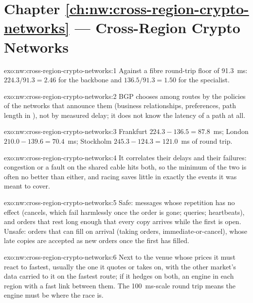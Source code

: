 \section*{Chapter \ref{ch:nw:cross-region-crypto-networks} --- Cross-Region Crypto Networks}

\begin{solution}{exo:nw:cross-region-crypto-networks:1}
Against a fibre round-trip floor of \qty{91.3}{\milli\second}: $224.3/91.3 = 2.46$ for the backbone and $136.5/91.3 = 1.50$ for the specialist.
\end{solution}

\begin{solution}{exo:nw:cross-region-crypto-networks:2}
BGP chooses among routes by the policies of the networks that announce them (business relationships, preferences, path length in ),
not by measured delay; it does not know the latency of a path at all.
\end{solution}

\begin{solution}{exo:nw:cross-region-crypto-networks:3}
Frankfurt $224.3 - 136.5 = 87.8$~ms; London $210.0 - 139.6 = 70.4$~ms; Stockholm $245.3 - 124.3 = 121.0$~ms of round trip.
\end{solution}

\begin{solution}{exo:nw:cross-region-crypto-networks:4}
It correlates their delays and their failures: congestion or a fault on the shared cable hits both, so the minimum of the two is often no better
than either, and racing saves little in exactly the events it was meant to cover.
\end{solution}

\begin{solution}{exo:nw:cross-region-crypto-networks:5}
Safe: messages whose repetition has no effect (cancels, which fail harmlessly once the order is gone; queries; heartbeats), and orders that rest
long enough that every copy arrives while the first is open. Unsafe: orders that can fill on arrival (taking orders, immediate-or-cancel), whose late
copies are accepted as new orders once the first has filled.
\end{solution}

\begin{solution}{exo:nw:cross-region-crypto-networks:6}
Next to the venue whose prices it must react to fastest, usually the one it quotes or takes on, with the other market's data carried to it on the
fastest route; if it hedges on both, an engine in each region with a fast link between them. The \qty{100}{\milli\second}-scale round trip means the
engine must be where the race is.
\end{solution}

